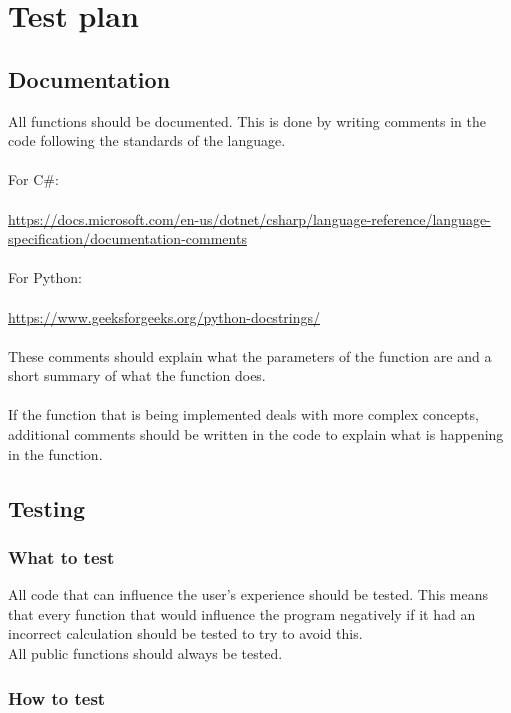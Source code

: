 \section{Test plan}
\label{app:test-plan}
\subsection{Documentation}
All functions should be documented. 
This is done by writing comments in the code following the standards of the language.
\\\\
For C\#: 
\\\\
\url{https://docs.microsoft.com/en-us/dotnet/csharp/language-reference/language-specification/documentation-comments}
\\\\
For Python:
\\\\
\url{https://www.geeksforgeeks.org/python-docstrings/}
\\\\
These comments should explain what the parameters of the function are and a short summary of what the function does.
\\\\
If the function that is being implemented deals with more complex concepts, additional comments should be written in the code to explain what is happening in the function.

\subsection{Testing}
\subsubsection{What to test}
All code that can influence the user's experience should be tested. 
This means that every function that would influence the program negatively if it had an incorrect calculation should be tested to try to avoid this.
\\
All public functions should always be tested.

\subsubsection{How to test}

